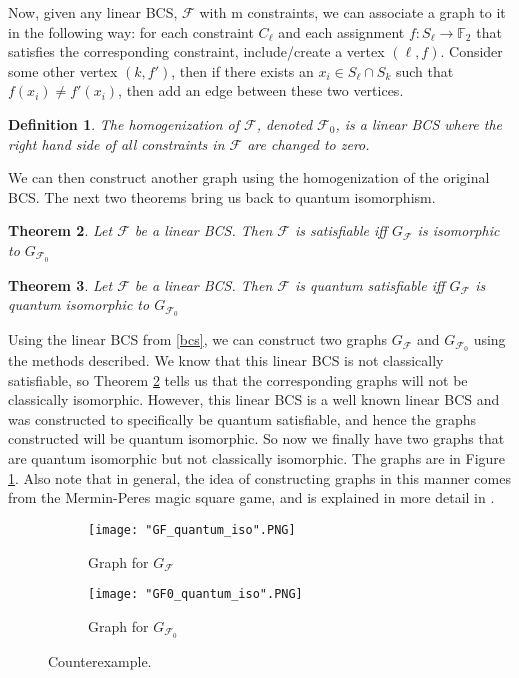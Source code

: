 \documentclass[12pt]{article}
\newtheorem{thm}{Theorem}[section]
\newtheorem{defn}[thm]{Definition}
\begin{document}
Now, given any linear BCS, $\mathcal{F}$ with m constraints, we can
associate a graph to it in the following way: for each constraint
$C_{\ell}$ and each assignment $f:S_{\ell} \rightarrow \mathbb{F}_2$
that satisfies the corresponding constraint, include/create a vertex
$(\ell, f)$. Consider some other vertex $(k, f')$, then if there
exists an $x_i \in S_{\ell} \cap S_{k}$ such that $f(x_i) \neq
f'(x_i)$, then add an edge between these two vertices.

\begin{defn}
  The homogenization of $\mathcal{F}$, denoted $\mathcal{F}_0$, is a
  linear BCS where the right hand side of all constraints in
  $\mathcal{F}$ are changed to zero.
\end{defn}

We can then construct another graph using the homogenization of the
original BCS. The next two theorems bring us back to quantum
isomorphism.

\begin{thm}
  \label{classicalBCS}
  Let $\mathcal{F}$ be a linear BCS. Then $\mathcal{F}$ is satisfiable
  iff $G_{\mathcal{F}}$ is isomorphic to $G_{\mathcal{F}_0}$
\end{thm}

\begin{thm}
  \label{quantumBCS}
  Let $\mathcal{F}$ be a linear BCS. Then $\mathcal{F}$ is quantum
  satisfiable iff $G_{\mathcal{F}}$ is quantum isomorphic to
  $G_{\mathcal{F}_0}$
\end{thm}

Using the linear BCS from \ref{bcs}, we can construct two graphs
$G_{\mathcal{F}}$ and $G_{\mathcal{F}_0}$ using the methods
described. We know that this linear BCS is not classically
satisfiable, so Theorem \ref{classicalBCS} tells us that the
corresponding graphs will not be classically isomorphic. However, this
linear BCS is a well known linear BCS and was constructed to
specifically be quantum satisfiable, and hence the graphs constructed
will be quantum isomorphic. So now we finally have two graphs that are
quantum isomorphic but not classically isomorphic. The graphs are in
Figure \ref{fig:qisoNOTiso}. Also note that in general, the idea of
constructing graphs in this manner comes from the Mermin-Peres magic
square game, and is explained in more detail in \cite{a2012}.

\begin{figure}
\centering
  \begin{subfigure}[b]{0.4\textwidth}
    \texttt{[image: "GF\_quantum\_iso".PNG]}
    \caption{Graph for $G_{\mathcal{F}}$}
  \end{subfigure}
  \begin{subfigure}[b]{0.4\textwidth}
    \texttt{[image: "GF0\_quantum\_iso".PNG]}
    \caption{Graph for $G_{\mathcal{F}_0}$}
  \end{subfigure}
\caption{Counterexample.}
\label{fig:qisoNOTiso}
\end{figure}
\end{document}
